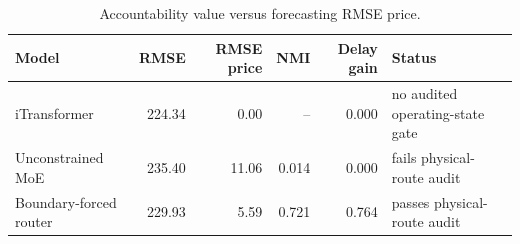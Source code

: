 \begin{table}[H]
\centering
\scriptsize
\setlength{\tabcolsep}{3pt}
\renewcommand{\arraystretch}{1.08}
\caption{Accountability value versus forecasting RMSE price.}
\begin{tabular}{lrrrrl}
\toprule
Model & RMSE & RMSE price & NMI & Delay gain & Status \\
\midrule
iTransformer & 224.34 & 0.00 & -- & 0.000 & no audited operating-state gate \\
Unconstrained MoE & 235.40 & 11.06 & 0.014 & 0.000 & fails physical-route audit \\
Boundary-forced router & 229.93 & 5.59 & 0.721 & 0.764 & passes physical-route audit \\
\bottomrule
\end{tabular}
\end{table}
